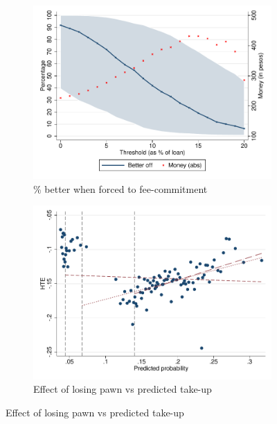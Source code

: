 \documentclass[11pt]{article}
\begin{document}
\begin{figure}[H]
\begin{center}
\begin{subfigure}{0.45\textwidth}
    \end{subfigure}
        \begin{subfigure}{0.45\textwidth}
        \caption{\% better when forced to fee-commitment}
        \centering
        \includegraphics[width=\textwidth]{Figuras/line_better_forceall_fc_te_cf.pdf}
        
    \end{subfigure}
        \begin{subfigure}{0.45\textwidth}
        \caption{\footnotesize{Effect of losing pawn vs predicted take-up}}
        \centering
        \includegraphics[width=\textwidth]{Figuras/takeuppr_def.pdf}
    \end{subfigure}
    

\end{center}
\end{figure}
\end{document}
